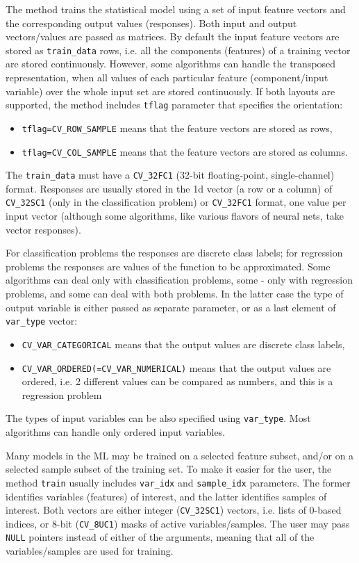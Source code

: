 The method trains the statistical model using a set of input feature vectors and the corresponding output values (responses). Both input and output vectors/values are passed as matrices. By default the input feature vectors are stored as \texttt{train\_data} rows, i.e. all the components (features) of a training vector are stored continuously. However, some algorithms can handle the transposed representation, when all values of each particular feature (component/input variable) over the whole input set are stored continuously. If both layouts are supported, the method includes \texttt{tflag} parameter that specifies the orientation:
\begin{itemize}
 \item \texttt{tflag=CV\_ROW\_SAMPLE} means that the feature vectors are stored as rows,
 \item \texttt{tflag=CV\_COL\_SAMPLE} means that the feature vectors are stored as columns.
\end{itemize}
The \texttt{train\_data} must have a \texttt{CV\_32FC1} (32-bit floating-point, single-channel) format. Responses are usually stored in the 1d vector (a row or a column) of \texttt{CV\_32SC1} (only in the classification problem) or \texttt{CV\_32FC1} format, one value per input vector (although some algorithms, like various flavors of neural nets, take vector responses).

For classification problems the responses are discrete class labels; for regression problems the responses are values of the function to be approximated. Some algorithms can deal only with classification problems, some - only with regression problems, and some can deal with both problems. In the latter case the type of output variable is either passed as separate parameter, or as a last element of \texttt{var\_type} vector:
\begin{itemize}
 \item \texttt{CV\_VAR\_CATEGORICAL} means that the output values are discrete class labels,
 \item \texttt{CV\_VAR\_ORDERED(=CV\_VAR\_NUMERICAL)} means that the output values are ordered, i.e. 2 different values can be compared as numbers, and this is a regression problem
\end{itemize}
The types of input variables can be also specified using \texttt{var\_type}. Most algorithms can handle only ordered input variables.

Many models in the ML may be trained on a selected feature subset, and/or on a selected sample subset of the training set. To make it easier for the user, the method \texttt{train} usually includes \texttt{var\_idx} and \texttt{sample\_idx} parameters. The former identifies variables (features) of interest, and the latter identifies samples of interest. Both vectors are either integer (\texttt{CV\_32SC1}) vectors, i.e. lists of 0-based indices, or 8-bit (\texttt{CV\_8UC1}) masks of active variables/samples. The user may pass \texttt{NULL} pointers instead of either of the arguments, meaning that all of the variables/samples are used for training.

